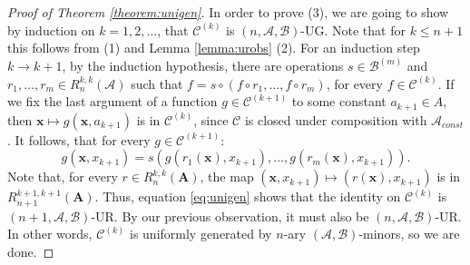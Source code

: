 \documentclass[11pt]{amsart}
\theoremstyle{plain}
\theoremstyle{definition}
\newcommand{\alg}[1]{\mathbf{#1}}
\newcommand{\clone}[1]{\mathcal{#1}}
\newcommand{\clonoid}[1]{\mathcal{#1}}
\newcommand{\clodC}{\clonoid{C}}
\newcommand{\clodO}{\clonoid{O}}
\newcommand{\algA}{\alg{A}}
\newcommand{\cloA}{\clone{A}}
\newcommand{\cloB}{\clone{B}}
\newcommand{\cloC}{\clone{C}}
\begin{document}
\begin{proof}[Proof of Theorem \ref{theorem:unigen}]
In order to prove (3), we are going to show by induction on $k=1,2,\ldots$, that $\clodC^{(k)}$ is $(n,\cloA,\cloB)$-UG. Note that for $k \leq n+1$ this follows from (1) and Lemma \ref{lemma:urobs} (2). For an induction step $k \to k+1$, by the induction hypothesis, there are operations $s \in \cloB^{(m)}$ and $r_1,\ldots,r_m \in R^{{k,k}}_n(\cloA)$ such that $f  = s \circ (f \circ r_1,\ldots, f \circ r_{m})$, for every $f \in \clodC^{(k)}$. If we fix the last argument of a function $g \in \clodC^{(k+1)}$ to some constant $a_{k+1} \in A$, then $\mathbf x \mapsto g(\mathbf x, a_{k+1})$ is in $\clodC^{(k)}$, since $\clodC$ is closed under composition with $\cloA_{const}$. It follows, that for every $g \in \clodC^{(k+1)}$:
\begin{equation}
\label{eq:unigen}
g(\mathbf x, x_{k+1}) = s( g(r_1(\mathbf x), x_{k+1}), \ldots, g(r_m(\mathbf x), x_{k+1})).
\end{equation}
Note that, for every $r \in R^{k,k}_n(\algA)$, the map $(\mathbf x,x_{k+1}) \mapsto (r(\mathbf x),x_{k+1})$ is in $R^{k+1,k+1}_{n+1}(\algA)$. Thus, equation \eqref{eq:unigen} shows that the identity on $\cloC^{(k)}$ is $(n+1,\cloA,\cloB)$-UR. By our previous observation, it must also be $(n,\cloA,\cloB)$-UR. In other words, $\cloC^{(k)}$ is uniformly generated by $n$-ary $(\cloA,\cloB)$-minors, so we are done.

\end{proof}
\end{document}
